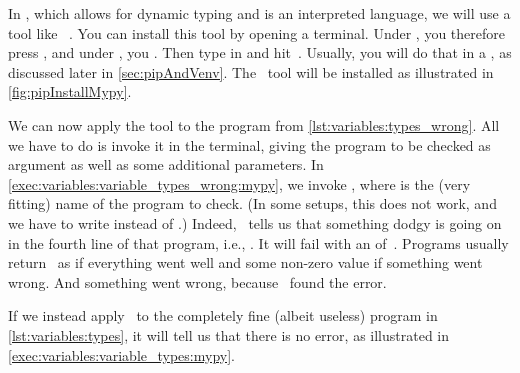 In \python, which allows for dynamic typing and is an interpreted language, we will use a tool like \mypy~\cite{LLHSVRZSJYYMC2024MOSTFP}.
You can install this tool by opening a terminal.
Under \ubuntu, you therefore press \ubuntuTerminal, and under \microsoftWindows, you \windowsTerminal.
Then type in  and hit~\keys{\return}.
Usually, you will do that in a , as discussed later in \cref{sec:pipAndVenv}.
The \mypy\ tool will be installed as illustrated in \cref{fig:pipInstallMypy}.%
%
\begin{sloppypar}%
We can now apply the tool to the program  from \cref{lst:variables:types_wrong}.
All we have to do is invoke it in the terminal, giving the program to be checked as argument as well as some additional parameters.
In \cref{exec:variables:variable_types_wrong:mypy}, we invoke , where  is the (very fitting) name of the program to check.
(In some setups, this does not work, and we have to write  instead of  .)
Indeed, \mypy\ tells us that something dodgy is going on in the fourth line of that program, i.e., .
It will fail with an  of~.
Programs usually return~ as  if everything went well and some non-zero value if something went wrong.
And something went wrong, because \mypy\ found the error.%
\end{sloppypar}%
%
%
%
If we instead apply \mypy\ to the completely fine (albeit useless) program  in \cref{lst:variables:types}, it will tell us that there is no error, as illustrated in \cref{exec:variables:variable_types:mypy}.
